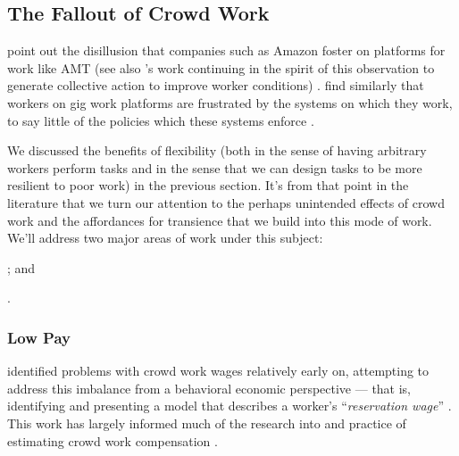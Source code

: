 \documentclass[trackingWork]{subfiles}
\begin{document}
{\begin{appendices}
    \subsection{The Fallout of Crowd Work}\label{sec:Fallout}
    \citeauthor{turkopticon} point out the disillusion that companies such as Amazon foster on platforms for work like AMT
    (see also \citeauthor{dynamo}'s work
    continuing in the spirit of this observation to generate collective action to improve worker conditions)
    \cite{turkopticon,dynamo}.
    \citeauthor{uberAlgorithm}
    find similarly that workers on gig work platforms are frustrated by the systems on which they work,
    to say little of the policies which these systems enforce
    \cite{uberAlgorithm}.

    We discussed the benefits of flexibility
    (both in the sense of having arbitrary workers perform tasks and
    in the sense that we can design tasks to be more resilient to poor work)
    in the previous section.
    It's from that point in the literature that we turn our attention to
    the perhaps unintended effects of crowd work
    and the affordances for transience that we build into this mode of work.
    We'll address two major areas of work under this subject:
    \begin{inlinelist}
    \item {}; and
    \item {}.
    \end{inlinelist}

    \subsubsection{Low Pay}\label{sec:lowPay}


    \citeauthor{laborEconomicsOfCrowdsourcingHorton}
    identified problems with crowd work wages relatively early on,
    attempting to address this imbalance from a behavioral economic perspective ---
    that is, identifying and presenting a model that describes a worker's
    ``\textit{reservation wage}''
    \cite{laborEconomicsOfCrowdsourcingHorton}.
    This work has largely informed much of the research into and practice of estimating crowd work compensation
    \cite{incentivesShaw,paolacci2010running}.


\end{appendices}}
\end{document}
